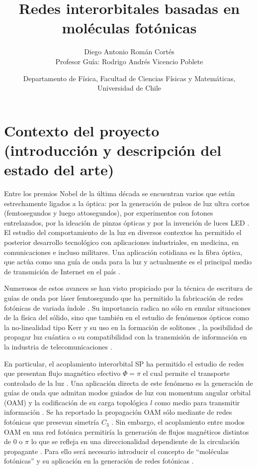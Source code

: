 \documentclass{article}
\author{Diego Antonio Román Cortés\\Profesor Guía: Rodrigo Andrés Vicencio Poblete}
\date{Departamento de Física, Facultad de Ciencias Físicas y Matemáticas, Universidad de Chile}
\title{Redes interorbitales basadas en moléculas fotónicas}
\begin{document}
 \maketitle

\section{Contexto del proyecto (introducción y descripción del estado del arte)}

Entre los premios Nobel de la última década se encuentran varios que están estrechamente ligados a la óptica: por la generación de pulsos de luz ultra cortos (femtosegundos y luego attosegundos), por experimentos con fotones entrelazados, por la ideación de pinzas ópticas y por la invención de luces LED \cite{nobel}. El estudio del comportamiento de la luz en diversos contextos ha permitido el posterior desarrollo tecnológico con aplicaciones industriales, en medicina, en comunicaciones e incluso militares. Una aplicación cotidiana es la fibra óptica, que actúa como una guía de onda para la luz y actualmente es el principal medio de transmición de Internet en el país \cite{fibra}. 
	
	Numerosos de estos avances se han visto propiciado por la técnica de escritura de guías de onda por láser femtosegundo que ha permitido la fabricación de redes fotónicas de variada índole \cite{femto, bics, lieb1, lieb2, artificialFB, FBdynamics, dendritas, splitters}. Su importancia radica no sólo en emular situaciones de la física del sólido, sino que también en el estudio de fenómenos ópticos como la no-linealidad tipo Kerr y su uso en la formación de solitones \cite{discretesolitons}, la posibilidad de propagar luz cuántica \cite{qed, squeezed, topoquantum} o su compatibilidad con la transmisión de información en la industria de telecomunicaciones \cite{telecom}.
	
	En particular, el acoplamiento interorbital SP ha permitido el estudio de redes que presentan flujo magnético efectivo $\Phi = \pi$ el cual permite el transporte controlado de la luz \cite{interorbital, OAMCaging, ABCaging}. Una aplicación directa de este fenómeno es la generación de guías de onda que admitan modos guiados de luz con momentum angular orbital (OAM) y la codificación de su carga topológica $l$ como medio para transmitir información \cite{oamapp, oamfree}. Se ha reportado la propagación OAM sólo mediante de redes fotónicas que presevan simetría $C_3$ \cite{OAMWG, vortex}. Sin embargo, el acoplamiento entre modos OAM en una red fotónica permitiría la generación de flujos magnéticos distintos de $0$ o $\pi$ lo que se refleja en una direccionalidad dependiente de la circulación propagante \cite{vortextrim, topoOAM}. Para ello será necesario introducir el concepto de ``moléculas fotónicas'' \cite{molecules} y su aplicación en la generación de redes fotónicas \cite{SPSSH}.
\end{document}
